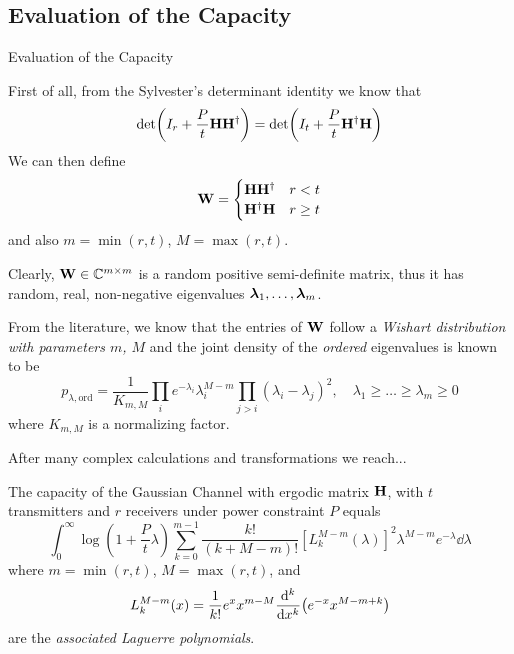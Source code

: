 \subsection{Evaluation of the Capacity}
\begin{frame}[allowframebreaks]{Evaluation of the Capacity}

First of all, from the Sylvester's determinant identity we know that
$$\det(I_r + \frac{P}{t}\vb{H\ensuremath{H^\dagger}}) = \det(I_t + \frac{P}{t}\vb{\ensuremath{H^\dagger}H})$$
We can then define
\begin{equation*}
\vb{W}=\begin{cases}
\vb{H\ensuremath{H^\dagger}}	& r<t\\
\vb{\ensuremath{H^\dagger}H}	& r\geq t
\end{cases}
\end{equation*}
and also $m=\min(r,t)$, $M=\max(r,t)$.

\medskip
Clearly, $\vb{W}\in \mathbb{C}^{m\times m}$ is a random positive semi-definite matrix, thus it has random, real, non-negative eigenvalues $\vb*{\lambda}_1,\ldots,\vb*{\lambda}_m$.

\framebreak

From the literature, we know that the entries of $\vb{W}$ follow a \textit{Wishart distribution with parameters $m$, $M$} and the joint density of the \textit{ordered} eigenvalues is known to be \cite{james1964}
$$p_{\lambda,\text{ord}} = 	\frac{1}{K_{m,M}}
\prod_i e^{-\lambda_i}\lambda_i^{M-m}
\prod_{j>i} (\lambda_i-\lambda_j)^2,
\quad \lambda_1\geq \ldots \geq \lambda_m \geq 0 $$
where $K_{m,M}$ is a normalizing factor.

\medskip
After many complex calculations and transformations we reach...

\framebreak

\begin{theorem}
	The capacity of the Gaussian Channel with ergodic matrix $\vb{H}$, with $t$ transmitters and $r$ receivers under power constraint $P$ equals
	$$\int_0^\infty \log(1+\frac{P}{t}\lambda)
	\sum_{k=0}^{m-1} \frac{k!}{(k+M-m)!}
	[L_k^{M-m}(\lambda)]^2
	\lambda^{M-m} e^{-\lambda}
	\dd{\lambda}$$
	where $m=\min(r,t)$, $M=\max(r,t)$, and
	$$L_k^{M-m}(x) = \frac{1}{k!}
	e^x x^{m-M}
	\dv[k]{}{x}
	\qty(e^{-x}x^{M-m+k})$$
	are the \textit{associated Laguerre polynomials}.
\end{theorem}

\end{frame}
